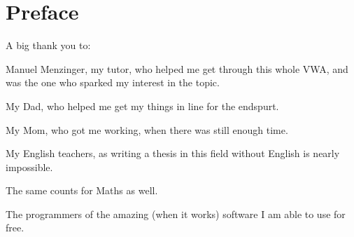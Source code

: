 \chapter*{Preface}
A big thank you to:

Manuel Menzinger, my tutor, who helped me get through this whole VWA, and was the one who sparked my interest in the topic.

My Dad, who helped me get my things in line for the endspurt.

My Mom, who got me working, when there was still enough time.

My English teachers, as writing a thesis in this field without English is nearly impossible.

The same counts for Maths as well.

The programmers of the amazing (when it works) software I am able to use for free.

